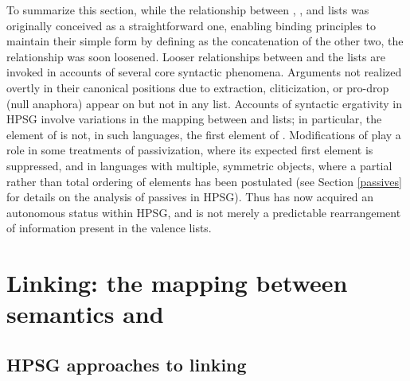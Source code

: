 \documentclass[output=paper
                ,modfonts
                ,nonflat
	        ,collection
	        ,collectionchapter
	        ,collectiontoclongg
 	        ,biblatex
                ,babelshorthands
                ,newtxmath
                ,draftmode
                ,colorlinks, citecolor=brown
]{./langsci/langscibook}
\begin{document}
To summarize this section, while the relationship between \argst, \subj, and \comps lists was originally conceived as a straightforward one, enabling binding principles to maintain their simple form by defining \argst as the concatenation of the other two, the relationship was soon loosened.
Looser
relationships between \argst and the \val lists are invoked in accounts of several core syntactic phenomena.
Arguments not realized overtly in their canonical positions 
due to extraction, cliticization, or pro-drop (null anaphora) appear on \argst but not in any \val list.  
Accounts of syntactic ergativity in HPSG involve variations in the mapping between \argst and \val lists; in particular, the element of \subj is not, in such languages, the first element of \argst.  
Modifications of \argst play a role in some treatments of passivization, where its expected first element is suppressed, and in languages with multiple, symmetric objects, where a partial rather than total ordering of \argst elements has been postulated (see Section \ref{passives} for details on the analysis of passives in HPSG).
Thus \argst has now acquired an autonomous %
status within HPSG, and is not merely a predictable rearrangement of information present in the valence lists.  


\section{Linking: the mapping between semantics and \argst}
\label{linking-sec}

\subsection{HPSG approaches to linking}
\end{document}
